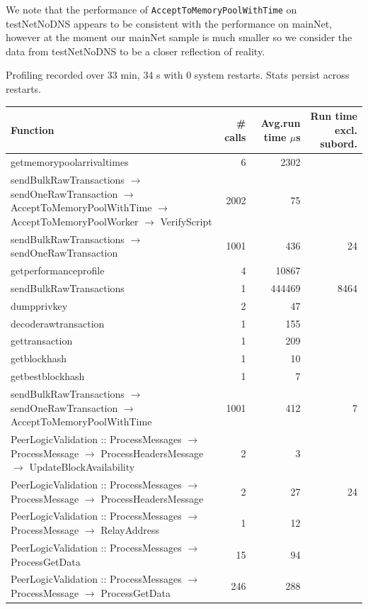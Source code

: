 \documentclass{article}
\begin{document}
We note that the performance of \verb|AcceptToMemoryPoolWithTime| on testNetNoDNS appears to be consistent with the performance on mainNet, however at the moment our mainNet sample is much smaller so we consider the data from testNetNoDNS to be a closer reflection of reality.



\begin{table}
	Profiling recorded over 33 min, 34 s with 0 system restarts. Stats persist across restarts.
	
	\begin{longtable}{P{8cm}|r|r|r}
		Function&\# calls& Avg.run time $\mu$s& Run time excl. subord. \\\hline
		getmemorypoolarrivaltimes& 6& 2302&\\\hline
		sendBulkRawTransactions $\to$ sendOneRawTransaction $\to$ AcceptToMemoryPoolWithTime $\to$ AcceptToMemoryPoolWorker $\to$ VerifyScript& 2002& 75&\\\hline
		sendBulkRawTransactions $\to$ sendOneRawTransaction& 1001& 436&24\\\hline
		getperformanceprofile& 4& 10867&\\\hline
		sendBulkRawTransactions& 1& 444469&8464\\\hline
		dumpprivkey& 2& 47&\\\hline
		decoderawtransaction& 1& 155&\\\hline
		gettransaction& 1& 209&\\\hline
		getblockhash& 1& 10&\\\hline
		getbestblockhash& 1& 7&\\\hline
		sendBulkRawTransactions $\to$ sendOneRawTransaction $\to$ AcceptToMemoryPoolWithTime& 1001& 412&7\\\hline
		PeerLogicValidation :: ProcessMessages $\to$ ProcessMessage $\to$ ProcessHeadersMessage $\to$ UpdateBlockAvailability& 2& 3&\\\hline
		PeerLogicValidation :: ProcessMessages $\to$ ProcessMessage $\to$ ProcessHeadersMessage& 2& 27&24\\\hline
		PeerLogicValidation :: ProcessMessages $\to$ ProcessMessage $\to$ RelayAddress& 1& 12&\\\hline
		PeerLogicValidation :: ProcessMessages $\to$ ProcessGetData& 15& 94&\\\hline
		PeerLogicValidation :: ProcessMessages $\to$ ProcessMessage $\to$ ProcessGetData& 246& 288&\\\hline

\end{longtable}
\end{table}
\end{document}
